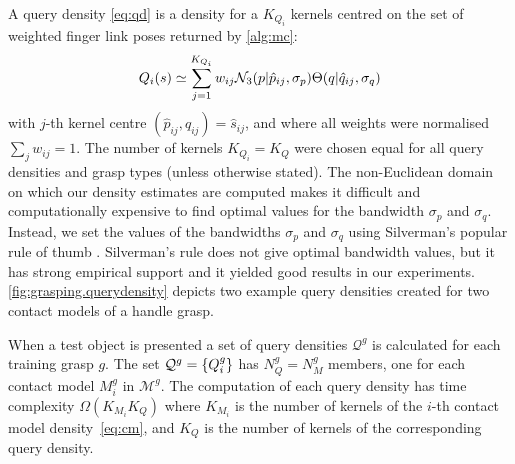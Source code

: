 A query density \eqref{eq:qd} is a density for a  $K_{Q_i}$ kernels centred on the set of weighted finger link poses returned by \alg\ref{alg:mc}:
\begin{equation}
\qd_i(s) \simeq \sum^{K_{Q_i}}_{j=1} w_{ij} \mathcal{N}_3(p|{\hat{p}_{ij}}, \sigma_{p}) \Theta(q|{\hat{q}_{ij}}, \sigma_{q})%
\label{eq:qd.approx}
\end{equation}
with $j$-th kernel centre $({\hat{p}_{ij}}, {\hat{q}_{ij}}) = \hat{s}_{ij}$, and where all weights were normalised $\sum_j w_{ij} = 1$. The number of kernels $K_{Q_i} = K_Q$ were chosen equal for all query densities and grasp types (unless otherwise stated). The non-Euclidean domain on which our density estimates are computed makes it difficult and computationally expensive to find optimal values for the bandwidth $\sigma_{p}$ and $\sigma_{q}$. Instead, we set the values of the bandwidths $\sigma_{p}$ and $\sigma_{q}$ using Silverman's popular rule of thumb \cite{silverman}. Silverman's rule does not give optimal bandwidth values, but it has strong empirical support and it yielded good results in our experiments. \fig\ref{fig:grasping.querydensity} depicts two example query densities created for two contact models of a handle grasp.

When a test object is presented a set of query densities $\mathcal{Q}^g$ is calculated for each training grasp $g$. The set $\mathcal{Q}^g =\{Q_i^g\}$ has $N^g_Q=N^g_M$ members, one for each contact model $M_i^g$ in $\mathcal{M}^g$. The computation of each  query density has time complexity $\Omega( K_{M_i} K_Q)$ where $K_{M_i}$ is the number of kernels of the $i$-th contact model density~\eqref{eq:cm}, and $K_Q$ is the number of kernels of the corresponding query density. 